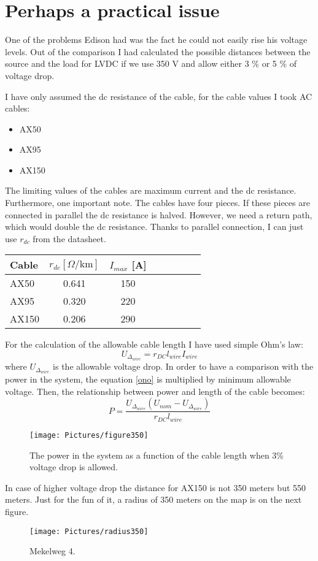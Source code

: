 \documentclass[]{scrartcl}
\begin{document}
\newpage
\newpage
\appendix
\section{Perhaps a practical issue}
One of the problems Edison had was the fact he could not easily rise his voltage levels. Out of the comparison I had calculated the possible distances between the source and the load for LVDC if we use 350 V and allow either 3 \% or 5 \% of voltage drop. 

I have only assumed the dc resistance of the cable, for the cable values I took AC cables:
\begin{itemize}
	\item AX50
	\item AX95
	\item AX150
\end{itemize}

The limiting values of the cables are maximum current and the dc resistance. Furthermore, one important note. The cables have four pieces. If  these pieces are connected in parallel the dc resistance is halved. However, we need a return path, which would double the dc resistance. Thanks to parallel connection, I can just use $r_{dc}$ from the datasheet. 
\begin{center}
	\begin{tabular}{l*{6}{c}r}
		Cable             & $r_{dc} [\Omega/\text{km}]$ & $I_{max}$ [A]  \\
		\hline
		\hline
		AX50  & 0.641 & 150   \\
		AX95  & 0.320 & 220   \\
		AX150 & 0.206 & 290   \\
	\end{tabular}
\end{center}


For the calculation of the allowable cable length I have used simple Ohm's law:
\begin{equation}
U_{\Delta_{wire}} = r_{DC}l_{wire}I_{wire}
\label{ono}
\end{equation}
where $U_{\Delta_{wire}}$ is the allowable voltage drop. In order to have a comparison with the power in the system, the equation \ref{ono} is multiplied by minimum allowable voltage. Then, the relationship between power and length of the cable becomes:
\begin{equation}
P = \frac{U_{\Delta_{wire}}\left(U_{nom}-U_{\Delta_{wire}}\right)}{r_{DC}l_{wire}}
\end{equation}
\begin{figure}[h!]
	\centering
	\texttt{[image: Pictures/figure350]}
	\caption{The power in the system as a function of the cable length when 3\% voltage drop is allowed.}
	\label{fig:figure350}
\end{figure}
In case of higher voltage drop the distance for AX150 is not 350 meters but 550 meters. Just for the fun of it, a radius of 350 meters on the map is on the next figure.
\begin{figure}[h!]
	\centering
	\texttt{[image: Pictures/radius350]}
	\caption{Mekelweg 4.}
	\label{fig:radius350}
\end{figure}
\end{document}

